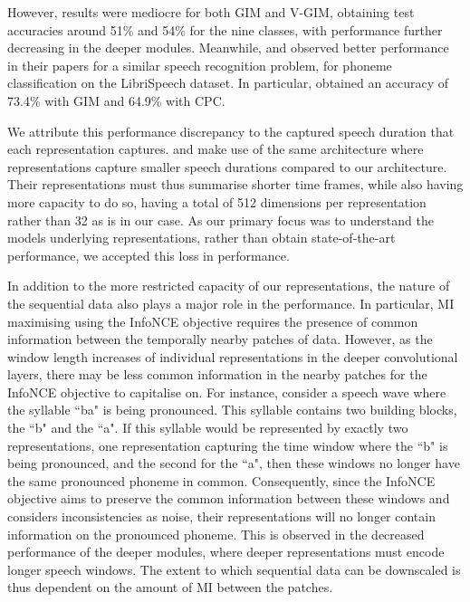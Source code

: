 	However, results were mediocre for both GIM and V-GIM, obtaining test accuracies around 51\% and 54\% for the nine classes, with performance further decreasing in the deeper modules. Meanwhile, \cite{oordRepresentationLearningContrastive2019} and \cite{lowePuttingEndEndtoEnd2020a} observed better performance in their papers for a similar speech recognition problem, for phoneme classification on the LibriSpeech dataset. In particular, \citeauthor{lowePuttingEndEndtoEnd2020a} obtained an accuracy of 73.4\% with GIM and 64.9\% with CPC.
	
	We attribute this performance discrepancy to the captured speech duration that each representation captures. \citeauthor{lowePuttingEndEndtoEnd2020a} and \citeauthor{oordRepresentationLearningContrastive2019} make use of the same architecture where representations capture smaller speech durations compared to our architecture. Their representations must thus summarise shorter time frames, while also having more capacity to do so, having a total of 512 dimensions per representation rather than 32 as is in our case. As our primary focus was to understand the models underlying representations, rather than obtain state-of-the-art performance, we accepted this loss in performance.
	
	In addition to the more restricted capacity of our representations, the nature of the sequential data also plays a major role in the performance. In particular, MI maximising using the InfoNCE objective requires the presence of common information between the temporally nearby patches of data. However, as the window length increases of individual representations in the deeper convolutional layers, there may be less common information in the nearby patches for the InfoNCE objective to capitalise on. For instance, consider a speech wave where the syllable ``ba" is being pronounced. This syllable contains two building blocks, the ``b" and the ``a". If this syllable would be represented by exactly two
	representations, one representation capturing the time window where the ``b" is being pronounced, and the second for the ``a", then these windows no longer have the same pronounced phoneme in common. Consequently, since the InfoNCE objective aims to preserve the common information between these windows and considers inconsistencies as noise, their representations will no longer contain information on the pronounced phoneme. This is observed in the decreased performance of the deeper modules, where deeper representations must encode longer speech windows. The extent to which sequential data can be downscaled is thus dependent on the amount of MI between the patches.
	
